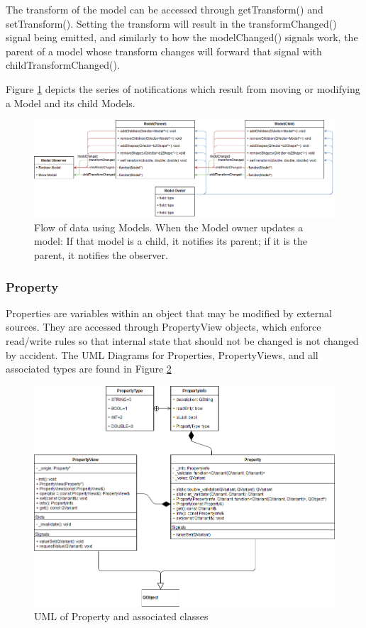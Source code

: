  The transform of the model can be accessed through getTransform() and setTransform(). Setting the transform will result in the transformChanged() signal being emitted, and similarly to how the modelChanged() signals work, the parent of a model whose transform changes will forward that signal with childTransformChanged().
 
 Figure \ref{uml:dataflow_model} depicts the series of notifications which result from moving or modifying a Model and its child Models.
 \begin{figure}[h]
 	\begin{center}
 	\includegraphics[width=\textwidth]{./images_design/uml/DataFlow_Model}
 	\caption{Flow of data using Models. When the Model owner updates a model: If that model is a child, it notifies its parent; if it is the parent, it notifies the observer.\label{uml:dataflow_model}}
 	\end{center}
 \end{figure}   
 
 \subsubsection*{Property}
 	Properties are variables within an object that may be modified by external sources. They are accessed through PropertyView objects, which enforce read/write rules so that internal state that should not be changed is not changed by accident. The UML Diagrams for Properties, PropertyViews, and all associated types are found in Figure \ref{uml:property}
 	
 \begin{figure}[h!]
 	\begin{center}
 	\includegraphics[width=\textwidth]{./images_design/uml/Property}
 	\caption{UML of Property and associated classes\label{uml:property}}
 	\end{center}
 \end{figure} 
 
